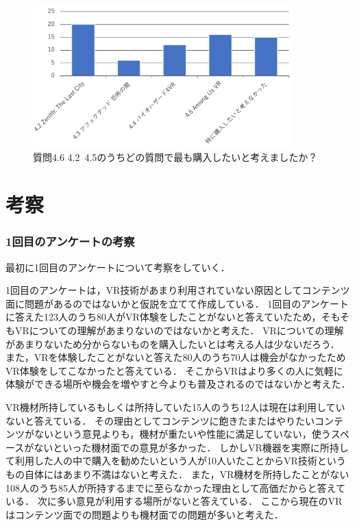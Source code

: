 \documentclass[12pt,a4j]{ltjsarticle}
\begin{document}
\begin{figure}[h]
\begin{center}
 \includegraphics[clip,height=55mm]{
 アンケート2_4_6.pdf}
\end{center}
 \caption{質問4.6 4.2~4.5のうちどの質問で最も購入したいと考えましたか？}
 \label{fig:アンケート2_4_6.pdf}
\end{figure}


\clearpage

\section{考察}
\subsubsection{1回目のアンケートの考察}
最初に1回目のアンケートについて考察をしていく．

1回目のアンケートは，VR技術があまり利用されていない原因としてコンテンツ面に問題があるのではないかと仮説を立てて作成している．
1回目のアンケートに答えた123人のうち80人がVR体験をしたことがないと答えていたため，そもそもVRについての理解があまりないのではないかと考えた．
VRについての理解があまりないため分からないものを購入したいとは考える人は少ないだろう．
また，VRを体験したことがないと答えた80人のうち70人は機会がなかったためVR体験をしてこなかったと答えている．
そこからVRはより多くの人に気軽に体験ができる場所や機会を増やすと今よりも普及されるのではないかと考えた．

VR機材所持しているもしくは所持していた15人のうち12人は現在は利用していないと答えている．
その理由としてコンテンツに飽きたまたはやりたいコンテンツがないという意見よりも，機材が重たいや性能に満足していない，使うスペースがないといった機材面での意見が多かった．
しかしVR機器を実際に所持して利用した人の中で購入を勧めたいという人が10人いたことからVR技術というもの自体にはあまり不満はないと考えた．
また，VR機材を所持したことがない108人のうち85人が所持するまでに至らなかった理由として高価だからと答えている．
次に多い意見が利用する場所がないと答えている．
ここから現在のVRはコンテンツ面での問題よりも機材面での問題が多いと考えた．
\end{document}
